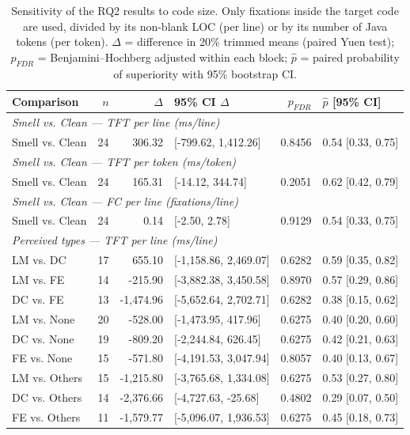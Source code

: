 \begin{table}[ht]
\centering
\caption{Sensitivity of the RQ2 results to code size. Only fixations inside the target code are used,
divided by its non-blank LOC (per line) or by its number of Java tokens (per token). $\Delta$ = difference in
20\% trimmed means (paired Yuen test); $p_{FDR}$ = Benjamini--Hochberg adjusted within each block;
$\hat p$ = paired probability of superiority with 95\% bootstrap CI.}
\label{tab:rq2_size_normalized}
\scriptsize
\begin{tabular}{lrrlrl}
\toprule
Comparison & $n$ & $\Delta$ & 95\% CI $\Delta$ & $p_{FDR}$ & $\hat p$ [95\% CI] \\
\midrule
\multicolumn{6}{l}{\textit{Smell vs. Clean --- TFT per line (ms/line)}} \\
Smell vs. Clean & 24 & 306.32 & [-799.62, 1,412.26] & 0.8456 & 0.54 [0.33, 0.75] \\
\midrule
\multicolumn{6}{l}{\textit{Smell vs. Clean --- TFT per token (ms/token)}} \\
Smell vs. Clean & 24 & 165.31 & [-14.12, 344.74] & 0.2051 & 0.62 [0.42, 0.79] \\
\midrule
\multicolumn{6}{l}{\textit{Smell vs. Clean --- FC per line (fixations/line)}} \\
Smell vs. Clean & 24 & 0.14 & [-2.50, 2.78] & 0.9129 & 0.54 [0.33, 0.75] \\
\midrule
\multicolumn{6}{l}{\textit{Perceived types --- TFT per line (ms/line)}} \\
LM vs. DC & 17 & 655.10 & [-1,158.86, 2,469.07] & 0.6282 & 0.59 [0.35, 0.82] \\
LM vs. FE & 14 & -215.90 & [-3,882.38, 3,450.58] & 0.8970 & 0.57 [0.29, 0.86] \\
DC vs. FE & 13 & -1,474.96 & [-5,652.64, 2,702.71] & 0.6282 & 0.38 [0.15, 0.62] \\
LM vs. None & 20 & -528.00 & [-1,473.95, 417.96] & 0.6275 & 0.40 [0.20, 0.60] \\
DC vs. None & 19 & -809.20 & [-2,244.84, 626.45] & 0.6275 & 0.42 [0.21, 0.63] \\
FE vs. None & 15 & -571.80 & [-4,191.53, 3,047.94] & 0.8057 & 0.40 [0.13, 0.67] \\
LM vs. Others & 15 & -1,215.80 & [-3,765.68, 1,334.08] & 0.6275 & 0.53 [0.27, 0.80] \\
DC vs. Others & 14 & -2,376.66 & [-4,727.63, -25.68] & 0.4802 & 0.29 [0.07, 0.50] \\
FE vs. Others & 11 & -1,579.77 & [-5,096.07, 1,936.53] & 0.6275 & 0.45 [0.18, 0.73] \\

\end{tabular}
\end{table}

